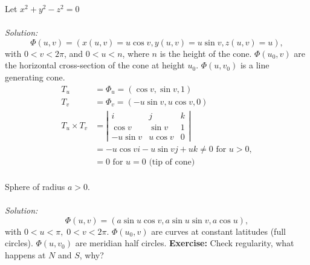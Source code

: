 \documentclass[12pt]{book}
\theoremstyle{definition}
\theoremstyle{remark}
\newcommand\sol{%
  \\ 
  \\
  \textit{Solution:}\\%
}
\begin{document}
   \begin{example}Let $x^2+ y^2 -z^2 = 0$
     \sol 
     $$\Phi(u,v) = (x(u,v)= u \cos v, y(u,v) =  u \sin v , z(u,v)=  u),$$ with $ 0 < v < 2 \pi $, and $0 < u < n$, where $n$ is the height of the cone. $\Phi(u_0, v)$ are the horizontal cross-section of the cone at height $u_0$. $\Phi(u, v_0)$ is a line generating cone. 
     \begin{equation*}
      \begin{split}
        T_u &= \Phi_u = (\cos v, \sin v , 1) \\ 
        T_v &= \Phi_v = (-u \sin v, u \cos v, 0) \\ 
        T_u \times T_v &= \left| \begin{matrix}
          i & j & k \\ \cos v & \sin v & 1 \\ - u \sin v & u \cos v & 0 
        \end{matrix}  \right|  \\ 
        &= - u \cos v i - u \sin v j + u k \neq 0 \text{ for } u > 0,\\ 
        &= 0 \text{ for } u = 0 \text{  (tip of cone)}\\ 
      \end{split}
     \end{equation*}
     
   \end{example}
\begin{example}
  Sphere of radius $a > 0$. 
  \sol 
  $$\Phi (u,v) = ( a \sin u \cos v, a\sin u \sin v, a \cos u ),$$ with $0< u < \pi, \; 0 < v< 2\pi$. $\Phi( u_0, v )$ are curves at constant latitudes (full circles). $\Phi(u, v_0)$ are meridian half circles. 
  \newline 
  \textbf{Exercise:} Check regularity, what happens at $N$ and $S$, why?
\end{example}
\end{document}
